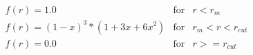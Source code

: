 \documentclass[12pt]{article}
\begin{document}
$$
\begin{array}{lcl}
f(r) = 1.0 &\mathrm{for}& r < r_m \\
f(r) = (1 - x)^3*(1+3x+6x^2) &\mathrm{for}& r_m < r < r_{cut} \\
f(r) = 0.0 &\mathrm{for}& r >= r_{cut} \\
\end{array}
$$
\end{document}
